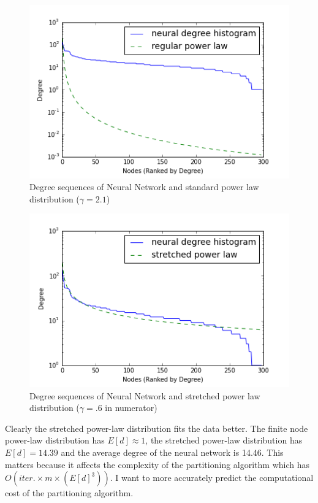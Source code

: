 \documentclass{article}
\begin{document}
\begin{figure}
\centering
\includegraphics[width = \linewidth]{neuralsequenceplot2.png}
\caption{Degree sequences of Neural Network and standard power law distribution ($\gamma = 2.1$)}
\end{figure}

\begin{figure}
\centering
\includegraphics[width = \linewidth]{neuralsequenceplot.png}
\caption{Degree sequences of Neural Network and stretched power law distribution ($\gamma = .6$ in numerator)}
\end{figure}

Clearly the stretched power-law distribution fits the data better. The finite node power-law distribution has $E[d] \approx 1$, the stretched power-law distribution has $E[d] = 14.39$ and the average degree of the neural network is 14.46. This matters because it affects the complexity of the partitioning algorithm which has $O(iter.\times m\times (E[d]^3))$. I want to more accurately predict the computational cost of the partitioning algorithm.
\end{document}
